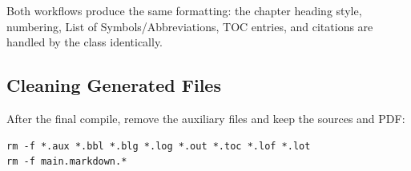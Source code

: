 Both workflows produce the same formatting: the chapter heading style, numbering, List of Symbols/Abbreviations, TOC entries, and citations are handled by the class identically.

\subsection{Cleaning Generated Files}

After the final compile, remove the auxiliary files and keep the sources and PDF:

\begin{verbatim}
rm -f *.aux *.bbl *.blg *.log *.out *.toc *.lof *.lot
rm -f main.markdown.*
\end{verbatim}
